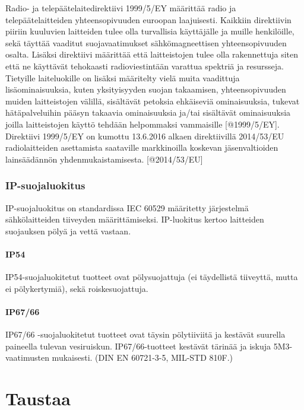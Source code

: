 \documentclass[11pt,a4paper,oneside,article]{memoir}
\begin{document}
Radio- ja telepäätelaitedirektiivi 1999/5/EY määrittää radio ja
telepäätelaitteiden yhteensopivuuden euroopan laajuisesti. Kaikkiin
direktiivin piiriin kuuluvien laitteiden tulee olla turvallisia
käyttäjälle ja muille henkilöille, sekä täyttää vaaditut
suojavaatimukset sähkömagneettisen yhteensopivuuden osalta. Lisäksi
direktiivi määrittää että laitteistojen tulee olla rakennettuja siten
että ne käyttävät tehokaasti radioviestintään varattua spektriä ja
resursseja. Tietyille laiteluokille on lisäksi määritelty vielä muita
vaadittuja lisäominaisuuksia, kuten yksityisyyden suojan takaamisen,
yhteensopivuuden muiden laitteistojen välillä, sisältävät petoksia
ehkäiseviä ominaisuuksia, tukevat hätäpalveluihin pääsyn takaavia
ominaisuuksia ja/tai sisältävät ominaisuuksia joilla laitteistojen
käyttö tehdään helpommaksi vammaisille {[}@1999/5/EY{]}. Direktiivi
1999/5/EY on kumottu 13.6.2016 alkaen direktiivillä 2014/53/EU
radiolaitteiden asettamista saataville markkinoilla koskevan
jäsenvaltioiden lainsäädännön yhdenmukaistamisesta. {[}@2014/53/EU{]}

\subsection{IP-suojaluokitus}

IP-suojaluokitus on standardissa IEC 60529 määritetty järjestelmä
sähkölaitteiden tiiveyden määrittämiseksi. IP-luokitus kertoo laitteiden
suojauksen pölyä ja vettä vastaan. \cite{IEC60529}

\subsubsection{IP54}

IP54-suojaluokitetut tuotteet ovat pölysuojattuja (ei täydellistä
tiiveyttä, mutta ei pölykertymiä), sekä roiskesuojattuja.

\subsubsection{IP67/66}

IP67/66 -suojaluokitetut tuotteet ovat täysin pölytiiviitä ja kestävät
suurella paineella tulevan vesiruiskun. IP67/66-tuotteet kestävät
tärinää ja iskuja 5M3-vaatimusten mukaisesti. (DIN EN 60721-3-5, MIL-STD
810F.)

\chapter{Taustaa}
\end{document}
